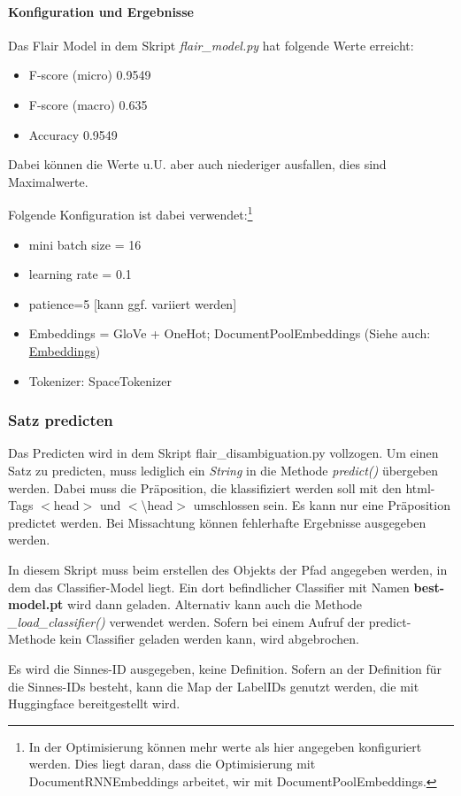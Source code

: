\documentclass[10pt,a4paper]{article}
\begin{document}
\paragraph{Konfiguration und Ergebnisse}
\begin{flushleft}
Das Flair Model in dem Skript \textit{flair\_model.py} hat folgende Werte erreicht:
\begin{itemize}
\item F-score (micro) 0.9549
\item F-score (macro) 0.635
\item Accuracy 0.9549
\end{itemize}
Dabei können die Werte u.U. aber auch niederiger ausfallen, dies sind Maximalwerte.

Folgende Konfiguration ist dabei verwendet:\footnote{In der Optimisierung können mehr werte als hier angegeben konfiguriert werden. Dies liegt daran, dass die Optimisierung mit DocumentRNNEmbeddings arbeitet, wir mit DocumentPoolEmbeddings.}
\begin{itemize}
\item mini batch size = 16
\item learning rate = 0.1
\item patience=5 [kann ggf. variiert werden]
\item Embeddings = GloVe + OneHot; DocumentPoolEmbeddings (Siehe auch: \hyperlink{Embed}{Embeddings})
\item Tokenizer: SpaceTokenizer
\end{itemize}
\end{flushleft}

\subsubsection{Satz predicten}
\begin{flushleft}
Das Predicten wird in dem Skript flair\_disambiguation.py vollzogen. Um einen Satz zu predicten, muss lediglich ein \textit{String} in die Methode \textit{predict()} übergeben werden. Dabei muss die Präposition, die klassifiziert werden soll mit den html-Tags $<$head$>$ und $<$\textbackslash head$>$ umschlossen sein. Es kann nur eine Präposition predictet werden. Bei Missachtung können fehlerhafte Ergebnisse ausgegeben werden.

In diesem Skript muss beim erstellen des Objekts der Pfad angegeben werden, in dem das Classifier-Model liegt. Ein dort befindlicher Classifier mit Namen \textbf{best-model.pt} wird dann geladen. Alternativ kann auch die Methode \textit{\_load\_classifier()} verwendet werden. Sofern bei einem Aufruf der predict-Methode kein Classifier geladen werden kann, wird abgebrochen.

Es wird die Sinnes-ID ausgegeben, keine Definition. Sofern an der Definition für die Sinnes-IDs besteht, kann die Map der LabelIDs genutzt werden, die mit Huggingface bereitgestellt wird.
\end{flushleft}
\end{document}
